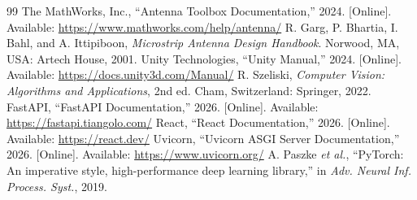 \documentclass[12pt,a4paper]{article}
\begin{document}
\begin{thebibliography}{99}
 The MathWorks, Inc., ``Antenna Toolbox Documentation,'' 2024. [Online]. Available: \url{https://www.mathworks.com/help/antenna/}
 R. Garg, P. Bhartia, I. Bahl, and A. Ittipiboon, \textit{Microstrip Antenna Design Handbook}. Norwood, MA, USA: Artech House, 2001.
 Unity Technologies, ``Unity Manual,'' 2024. [Online]. Available: \url{https://docs.unity3d.com/Manual/}
 R. Szeliski, \textit{Computer Vision: Algorithms and Applications}, 2nd ed. Cham, Switzerland: Springer, 2022.
 FastAPI, ``FastAPI Documentation,'' 2026. [Online]. Available: \url{https://fastapi.tiangolo.com/}
 React, ``React Documentation,'' 2026. [Online]. Available: \url{https://react.dev/}
 Uvicorn, ``Uvicorn ASGI Server Documentation,'' 2026. [Online]. Available: \url{https://www.uvicorn.org/}
 A. Paszke \textit{et al.}, ``PyTorch: An imperative style, high-performance deep learning library,'' in \textit{Adv. Neural Inf. Process. Syst.}, 2019.
\end{thebibliography}
\end{document}
